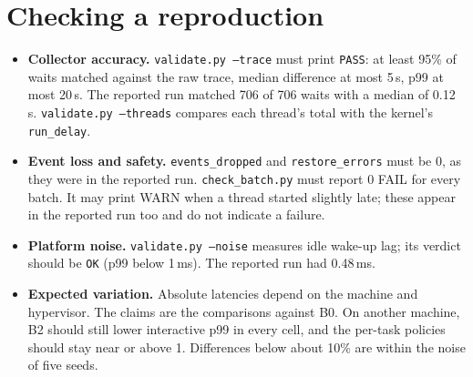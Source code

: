 \documentclass[10.5pt,a4paper]{article}
\newcommand{\f}[1]{\texttt{#1}}
\begin{document}
\section{Checking a reproduction}
\begin{itemize}
\item \textbf{Collector accuracy.} \f{validate.py --trace} must print \f{PASS}: at least 95\% of waits matched against the raw trace, median difference at most 5\,\textmu s, p99 at most 20\,\textmu s. The reported run matched 706 of 706 waits with a median of 0.12\,\textmu s. \f{validate.py --threads} compares each thread's total with the kernel's \f{run\_delay}.
\item \textbf{Event loss and safety.} \f{events\_dropped} and \f{restore\_errors} must be 0, as they were in the reported run. \f{check\_batch.py} must report 0 FAIL for every batch. It may print WARN when a thread started slightly late; these appear in the reported run too and do not indicate a failure.
\item \textbf{Platform noise.} \f{validate.py --noise} measures idle wake-up lag; its verdict should be \f{OK} (p99 below 1\,ms). The reported run had 0.48\,ms.
\item \textbf{Expected variation.} Absolute latencies depend on the machine and hypervisor. The claims are the comparisons against B0. On another machine, B2 should still lower interactive p99 in every cell, and the per-task policies should stay near or above 1. Differences below about 10\% are within the noise of five seeds.
\end{itemize}
\end{document}
